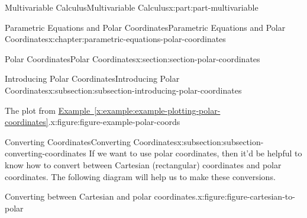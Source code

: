 \documentclass[twoside,10pt,]{book}
\newcommand{\xreffont}{\relax}
\numberwithin{equation}{part}
\begin{document}
\begin{partptx}{Multivariable Calculus}{}{Multivariable Calculus}{}{}{x:part:part-multivariable}
\begin{chapterptx}{Parametric Equations and Polar Coordinates}{}{Parametric Equations and Polar Coordinates}{}{}{x:chapter:parametric-equations-polar-coordinates}
\begin{sectionptx}{Polar Coordinates}{}{Polar Coordinates}{}{}{x:section:section-polar-coordinates}
\begin{subsectionptx}{Introducing Polar Coordinates}{}{Introducing Polar Coordinates}{}{}{x:subsection:subsection-introducing-polar-coordinates}
\begin{figureptx}{The plot from \hyperref[x:example:example-plotting-polar-coordinates]{Example~{\xreffont\ref{x:example:example-plotting-polar-coordinates}}}.}{x:figure:figure-example-polar-coords}{}
\begin{image}{0}{1}{0}
{
}%
\end{image}%
\tcblower
\end{figureptx}%
\end{subsectionptx}
%
%
\typeout{************************************************}
\typeout{************************************************}
%
\begin{subsectionptx}{Converting Coordinates}{}{Converting Coordinates}{}{}{x:subsection:subsection-converting-coordinates}
If we want to use polar coordinates, then it'd be helpful to know how to convert between Cartesian (rectangular) coordinates and polar coordinates. The following diagram will help us to make these conversions.%
\begin{figureptx}{Converting between Cartesian and polar coordinates.}{x:figure:figure-cartesian-to-polar}{}%
\begin{image}{0}{1}{0}%
\end{image}
\end{figureptx}
\end{subsectionptx}
\end{sectionptx}
\end{chapterptx}
\end{partptx}
\end{document}
